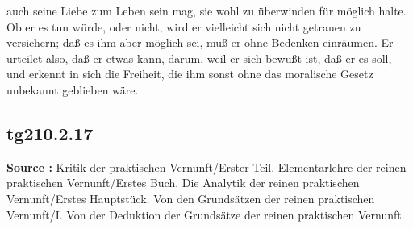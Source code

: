 \documentclass[a4paper,12pt,twoside]{book}
\begin{document}
auch seine Liebe zum Leben sein mag, sie wohl zu überwinden für möglich halte. Ob er es tun würde, oder nicht, wird er vielleicht sich nicht getrauen zu versichern; daß es ihm aber möglich sei, muß er ohne Bedenken einräumen. Er urteilet also, daß er etwas kann, darum, weil er sich bewußt ist, daß er es soll, und erkennt in sich die Freiheit, die ihm sonst ohne das moralische Gesetz unbekannt geblieben wäre. 
	
	\subsection*{tg210.2.17} 
	\textbf{Source : }Kritik der praktischen Vernunft/Erster Teil. Elementarlehre der reinen praktischen Vernunft/Erstes Buch. Die Analytik der reinen praktischen Vernunft/Erstes Hauptstück. Von den Grundsätzen der reinen praktischen Vernunft/I. Von der Deduktion der Grundsätze der reinen praktischen Vernunft\\  
	
\end{document}
